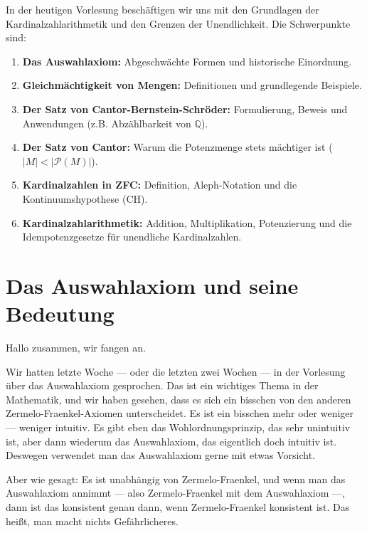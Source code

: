 
\begin{nice-box}
In der heutigen Vorlesung beschäftigen wir uns mit den Grundlagen der Kardinalzahlarithmetik und den Grenzen der Unendlichkeit. Die Schwerpunkte sind:
\begin{enumerate}[label=\textbf{\arabic*.}]
    \item \textbf{Das Auswahlaxiom:} Abgeschwächte Formen und historische Einordnung.
    \item \textbf{Gleichmächtigkeit von Mengen:} Definitionen und grundlegende Beispiele.
    \item \textbf{Der Satz von Cantor-Bernstein-Schröder:} Formulierung, Beweis und Anwendungen (z.B. Abzählbarkeit von $\mathbb{Q}$).
    \item \textbf{Der Satz von Cantor:} Warum die Potenzmenge stets mächtiger ist ($|M| < |\mathcal{P}(M)|$).
    \item \textbf{Kardinalzahlen in ZFC:} Definition, Aleph-Notation und die Kontinuumshypothese (CH).
    \item \textbf{Kardinalzahlarithmetik:} Addition, Multiplikation, Potenzierung und die Idempotenzgesetze für unendliche Kardinalzahlen.
\end{enumerate}
\end{nice-box}

\section{Das Auswahlaxiom und seine Bedeutung}

\begin{spoken-clean}[00:00:00 - 00:01:55]
Hallo zusammen, wir fangen an.

Wir hatten letzte Woche --- oder die letzten zwei Wochen --- in der Vorlesung über das Auswahlaxiom gesprochen. Das ist ein wichtiges Thema in der Mathematik, und wir haben gesehen, dass es sich ein bisschen von den anderen Zermelo-Fraenkel-Axiomen unterscheidet. Es ist ein bisschen mehr oder weniger --- weniger intuitiv. Es gibt eben das Wohlordnungsprinzip, das sehr unintuitiv ist, aber dann wiederum das Auswahlaxiom, das eigentlich doch intuitiv ist. Deswegen verwendet man das Auswahlaxiom gerne mit etwas Vorsicht.

Aber wie gesagt: Es ist unabhängig von Zermelo-Fraenkel, und wenn man das Auswahlaxiom annimmt --- also Zermelo-Fraenkel mit dem Auswahlaxiom ---, dann ist das konsistent genau dann, wenn Zermelo-Fraenkel konsistent ist. Das heißt, man macht nichts Gefährlicheres.
\end{spoken-clean}

